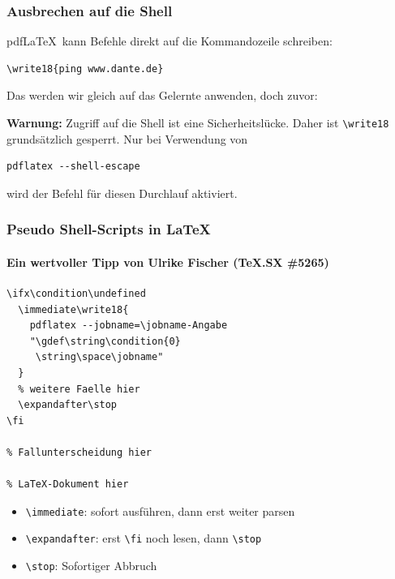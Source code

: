\documentclass[]{beamer}
\begin{document}
\begin{frame}[fragile]
\frametitle{Ausbrechen auf die Shell}

pdf\LaTeX\ kann Befehle direkt auf die Kommandozeile schreiben:

\begin{center}
\begin{minipage}{0.45\linewidth}
\begin{lstlisting}[style=arn:lst:tex]
\write18{ping www.dante.de}
\end{lstlisting}
\end{minipage}
\end{center}

\pause Das werden wir gleich auf das Gelernte anwenden, doch zuvor:

\pause\bigskip

\textbf{Warnung:} Zugriff auf die Shell ist eine \alert{Sicherheitslücke}.
Daher ist \verb+\write18+ grundsätzlich gesperrt. Nur bei Verwendung von
\begin{center}
\begin{minipage}{0.45\linewidth}
\begin{lstlisting}[style=arn:lst:bash]
pdflatex --shell-escape
\end{lstlisting}
\end{minipage}
\end{center}
wird der Befehl für diesen Durchlauf aktiviert.
\end{frame}


\begin{frame}[fragile]
\frametitle{Pseudo Shell-Scripts in \LaTeX{}}
\framesubtitle{Ein wertvoller Tipp von Ulrike Fischer (TeX.SX \#5265)}

\begin{center}
\begin{minipage}{0.8\linewidth}
\begin{lstlisting}[title={Blatt01.tex}, style=arn:lst:tex]
\ifx\condition\undefined
  \immediate\write18{
    pdflatex --jobname=\jobname-Angabe
    "\gdef\string\condition{0}
     \string\space\jobname"
  }
  % weitere Faelle hier
  \expandafter\stop
\fi

% Fallunterscheidung hier

% LaTeX-Dokument hier
\end{lstlisting}
\end{minipage}
\end{center}

\pause
\begin{itemize}[<+->]
\item \verb+\immediate+: sofort ausführen, dann erst weiter parsen
\item \verb+\expandafter+: erst \verb+\fi+ noch lesen, dann \verb+\stop+
\item \verb+\stop+: Sofortiger Abbruch
\end{itemize}

\end{frame}
\end{document}
